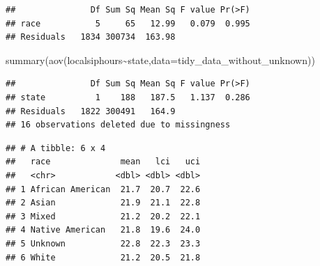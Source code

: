 \documentclass[
  11 pt,
]{article}
\newenvironment{Shaded}{\begin{snugshade}}{\end{snugshade}}
\newcommand{\AttributeTok}[1]{\textcolor[rgb]{0.77,0.63,0.00}{#1}}
\newcommand{\CommentTok}[1]{\textcolor[rgb]{0.56,0.35,0.01}{\textit{#1}}}
\newcommand{\DecValTok}[1]{\textcolor[rgb]{0.00,0.00,0.81}{#1}}
\newcommand{\FloatTok}[1]{\textcolor[rgb]{0.00,0.00,0.81}{#1}}
\newcommand{\FunctionTok}[1]{\textcolor[rgb]{0.00,0.00,0.00}{#1}}
\newcommand{\NormalTok}[1]{#1}
\newcommand{\OtherTok}[1]{\textcolor[rgb]{0.56,0.35,0.01}{#1}}
\newcommand{\SpecialCharTok}[1]{\textcolor[rgb]{0.00,0.00,0.00}{#1}}
\newcommand{\StringTok}[1]{\textcolor[rgb]{0.31,0.60,0.02}{#1}}
\begin{document}
\begin{verbatim}
##               Df Sum Sq Mean Sq F value Pr(>F)
## race           5     65   12.99   0.079  0.995
## Residuals   1834 300734  163.98
\end{verbatim}

\begin{Shaded}
\begin{Highlighting}[]
\FunctionTok{summary}\NormalTok{(}\FunctionTok{aov}\NormalTok{(localsiphours}\SpecialCharTok{\textasciitilde{}}\NormalTok{state,}\AttributeTok{data=}\NormalTok{tidy\_data\_without\_unknown))}
\end{Highlighting}
\end{Shaded}

\begin{verbatim}
##               Df Sum Sq Mean Sq F value Pr(>F)
## state          1    188   187.5   1.137  0.286
## Residuals   1822 300491   164.9               
## 16 observations deleted due to missingness
\end{verbatim}

\begin{Shaded}
\end{Shaded}

\begin{verbatim}
## # A tibble: 6 x 4
##   race              mean   lci   uci
##   <chr>            <dbl> <dbl> <dbl>
## 1 African American  21.7  20.7  22.6
## 2 Asian             21.9  21.1  22.8
## 3 Mixed             21.2  20.2  22.1
## 4 Native American   21.8  19.6  24.0
## 5 Unknown           22.8  22.3  23.3
## 6 White             21.2  20.5  21.8
\end{verbatim}
\end{document}
